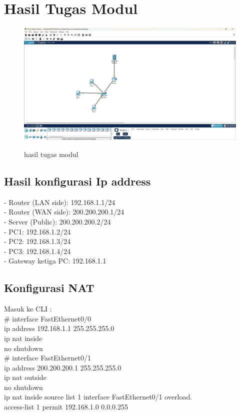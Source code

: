 \section{Hasil Tugas Modul}
\begin{figure}[H]
    \centering
    \includegraphics[width=0.65\linewidth]{image/tumod.jpg}
    \label{fig:inirujukan}
    \caption{hasil tugas modul}
\end{figure}
\subsection {Hasil konfigurasi Ip address} 
- Router (LAN side): 192.168.1.1/24 \\ 
- Router (WAN side): 200.200.200.1/24 \\
- Server (Public): 200.200.200.2/24 \\
- PC1: 192.168.1.2/24 \\
- PC2: 192.168.1.3/24 \\
- PC3: 192.168.1.4/24 \\
- Gateway ketiga PC: 192.168.1.1
\subsection{Konfigurasi NAT}
Masuk ke CLI : \\
\# interface FastEthernet0/0 \\
 ip address 192.168.1.1 255.255.255.0 \\
 ip nat inside \\
 no shutdown \\
\# interface FastEthernet0/1 \\
 ip address 200.200.200.1 255.255.255.0 \\
 ip nat outside \\
 no shutdown \\
 ip nat inside source list 1 interface FastEthernet0/1 overload. \\
 access-list 1 permit 192.168.1.0 0.0.0.255
